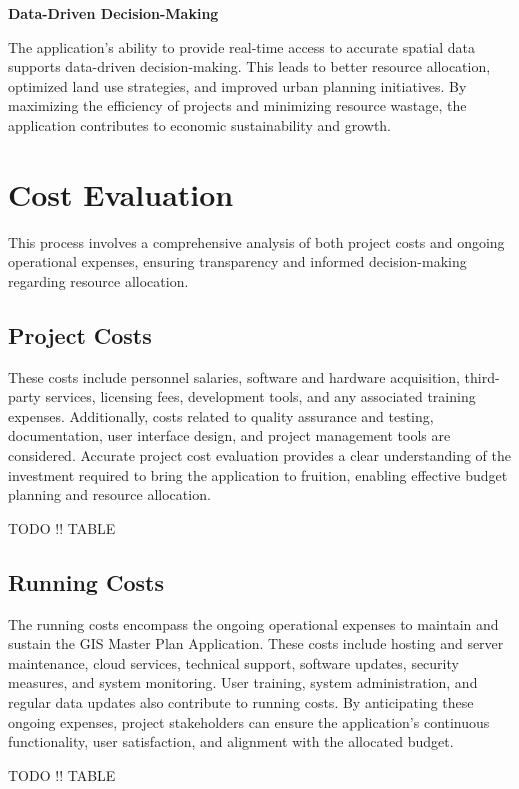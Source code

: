 \textbf{Data-Driven Decision-Making}

The application's ability to provide real-time access to accurate spatial data supports data-driven decision-making.
This leads to better resource allocation, optimized land use strategies, and improved urban planning initiatives.
By maximizing the efficiency of projects and minimizing resource wastage, the application contributes to economic sustainability and growth.


\section{Cost Evaluation}\label{sec:cost-evaluation}
This process involves a comprehensive analysis of both project costs and ongoing operational expenses, ensuring transparency and informed decision-making regarding resource allocation.
\subsection{Project Costs}\label{subsec:project-costs}
These costs include personnel salaries, software and hardware acquisition, third-party services, licensing fees, development tools, and any associated training expenses.
Additionally, costs related to quality assurance and testing, documentation, user interface design, and project management tools are considered.
Accurate project cost evaluation provides a clear understanding of the investment required to bring the application to fruition, enabling effective budget planning and resource allocation.

TODO !! TABLE


\subsection{Running Costs}\label{subsec:running-costs}
The running costs encompass the ongoing operational expenses to maintain and sustain the GIS Master Plan Application.
These costs include hosting and server maintenance, cloud services, technical support, software updates, security measures, and system monitoring. 
User training, system administration, and regular data updates also contribute to running costs. 
By anticipating these ongoing expenses, project stakeholders can ensure the application's continuous functionality, user satisfaction, and alignment with the allocated budget.

TODO !! TABLE
